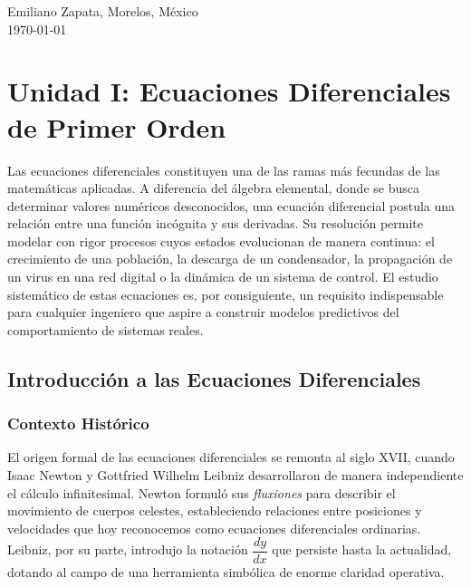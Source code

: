 \documentclass[12pt,letterpaper]{report}
\numberwithin{equation}{chapter}
\numberwithin{figure}{chapter}
\numberwithin{table}{chapter}
\begin{document}
\begin{titlepage}
    \vfill

    {\large Emiliano Zapata, Morelos, México}\\
    {\large \today}
\end{titlepage}

\tableofcontents
\cleardoublepage

\listoffigures
\cleardoublepage

\chapter{Unidad I: Ecuaciones Diferenciales de Primer Orden}

Las ecuaciones diferenciales constituyen una de las ramas más fecundas de las matemáticas aplicadas. A diferencia del álgebra elemental, donde se busca determinar valores numéricos desconocidos, una ecuación diferencial postula una relación entre una función incógnita y sus derivadas. Su resolución permite modelar con rigor procesos cuyos estados evolucionan de manera continua: el crecimiento de una población, la descarga de un condensador, la propagación de un virus en una red digital o la dinámica de un sistema de control. El estudio sistemático de estas ecuaciones es, por consiguiente, un requisito indispensable para cualquier ingeniero que aspire a construir modelos predictivos del comportamiento de sistemas reales.

\section{Introducción a las Ecuaciones Diferenciales}

\subsection{Contexto Histórico}

El origen formal de las ecuaciones diferenciales se remonta al siglo XVII, cuando Isaac Newton y Gottfried Wilhelm Leibniz desarrollaron de manera independiente el cálculo infinitesimal. Newton formuló sus \textit{fluxiones} para describir el movimiento de cuerpos celestes, estableciendo relaciones entre posiciones y velocidades que hoy reconocemos como ecuaciones diferenciales ordinarias. Leibniz, por su parte, introdujo la notación $\dfrac{dy}{dx}$ que persiste hasta la actualidad, dotando al campo de una herramienta simbólica de enorme claridad operativa.
\end{document}
